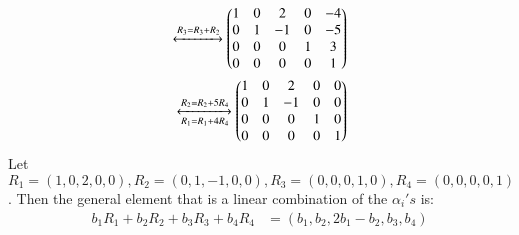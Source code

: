 \documentclass[journal,12pt,twocolumn]{IEEEtran}
\begin{document}
\begin{align}
            \xleftrightarrow{R_3 = R_3+R_2}
            \begin{pmatrix}1 & 0 & 2 & 0 & -4 \\
            0 & 1 & -1 & 0 & -5 \\
            0 & 0 & 0 & 1 & 3 \\
            0 & 0 & 0 & 0 & 1\end{pmatrix}\\
            \xleftrightarrow[R_1 = R_1+4R_4]{R_2=R_2+5R_4}
            \begin{pmatrix}1 & 0 & 2 & 0 & 0 \\
            0 & 1 & -1 & 0 & 0 \\
            0 & 0 & 0 & 1 & 0 \\
            0 & 0 & 0 & 0 & 1\end{pmatrix}
\end{align} 
Let $R_1=(1,0,2,0,0), R_2=(0,1,-1,0,0), R_3=(0,0,0,1,0),
R_4=(0,0,0,0,1)$. Then the general element that is a linear combination of the $\alpha_i's$ is:
\begin{align}
    b_1R_1 + b_2R_2 + b_3R_3 + b_4R_4 &= (b_1,b_2,2b_1-b_2,b_3,b_4)
\end{align}
\end{document}
